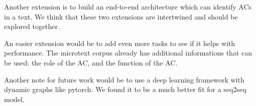\documentclass[onecolumn]{article}
\begin{document}
Another extension is to build an end-to-end architecture which can identify ACs in a text.
We think that these two extensions are intertwined and should be explored together.

An easier extension would be to add even more tasks to see if it helps with performance.
The microtext corpus already has additional informations that can be used: the role of the AC, and the function of the AC.

Another note for future work would be to use a deep learning framework with dynamic graphs like pytorch.
We found it to be a much better fit for a seq2seq model.

\nocite{*}


\end{document}
